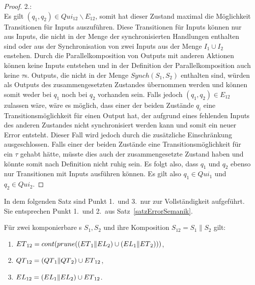 \begin{proof}
  2.:\\
  Es gilt $(q_1,q_2)\in Qui_{12}\backslash E_{12}$, somit hat
  dieser Zustand maximal die Möglichkeit Transitionen für Inputs auszuführen.
  Diese Transitionen für Inputs können nur aus Inputs, die nicht in der Menge
  der synchronisierten Handlungen enthalten sind oder aus der Synchronisation
  von zwei Inputs aus der Menge $I_1\cup I_2$ enstehen. Durch die
  Parallelkomposition von Outputs mit anderen Aktionen können keine Inputs
  entstehen und in der Definition der Parallelkomposition auch keine
  $\tau$s. Outputs, die nicht in der Menge $Synch(S_1,S_2)$ enthalten sind,
  würden als Outputs des zusammengesetzten Zustandes übernommen werden und
  können somit weder bei $q_1$ noch bei $q_2$ vorhanden sein. Falls jedoch
  $(q_1,q_2)\in E_{12}$ zulassen wäre, wäre es möglich, dass einer der beiden
  Zustände $q_i$ eine Transitionsmöglichkeit für einen Output hat, der aufgrund
  eines fehlenden Inputs des anderen Zustandes nicht synchronisiert werden kann
  und somit ein neuer Error entsteht. Dieser Fall wird jedoch durch die
  zusätzliche Einschränkung ausgeschlossen. Falls einer der beiden Zustände
  eine Transitionsmöglichkeit für ein $\tau$ gehabt hätte, müsste dies auch der
  zusammengesetzte Zustand haben und könnte somit nach Definition
  nicht ruhig sein. Es folgt also, dass $q_1$ und $q_2$ ebenso nur
  Transitionen mit Inputs ausführen können. Es gilt also $q_1\in Qui_1$ und
  $q_2\in Qui_2$.
\end{proof}

In dem folgenden Satz sind Punkt 1.\ und 3.\ nur zur Vollständigkeit aufgeführt.
Sie entsprechen Punkt 1.\ und 2.\ aus Satz~\ref{satzErrorSemanik}.

\begin{satz}
  \label{satzQuiSemantik}
  Für zwei komponierbare \EIO{}s $S_1, S_2$ und ihre Komposition $S_{12} =
  S_1\|S_2$ gilt:
  \begin{enumerate}
    \item $ET{}_{12} = cont{}(prune{}((ET{}_1\|EL{}_2)\cup
      (EL{}_1\|ET{}_2)))$,
    \item $QT{}_{12} = (QT{}_1\|QT{}_2)\cup ET{}_{12}$,
    \item $EL{}_{12} = (EL{}_1\|EL{}_2)\cup ET{}_{12}$.
  \end{enumerate}
\end{satz}


